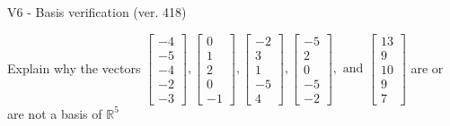 \begin{exercise}
  \begin{exerciseTitle}V6 - Basis verification (ver. 418)\end{exerciseTitle}
  \begin{exerciseStatement}
    Explain why the vectors \(\left[\begin{array}{r}
-4 \\
-5 \\
-4 \\
-2 \\
-3
\end{array}\right] , \left[\begin{array}{r}
0 \\
1 \\
2 \\
0 \\
-1
\end{array}\right] , \left[\begin{array}{r}
-2 \\
3 \\
1 \\
-5 \\
4
\end{array}\right] , \left[\begin{array}{r}
-5 \\
2 \\
0 \\
-5 \\
-2
\end{array}\right] , \text{ and } \left[\begin{array}{r}
13 \\
9 \\
10 \\
9 \\
7
\end{array}\right]\) are or are not a basis of \(\mathbb{R}^5\)	



\end{exerciseStatement}
\end{exercise}
